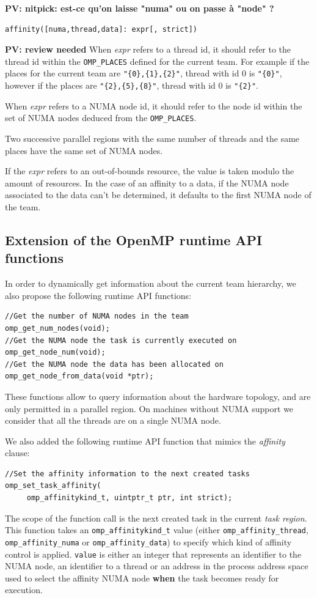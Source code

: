 \documentclass{Styles/llncs}
\newcommand{\PV}[1]{{\color{purple}\bfseries PV: #1}}
\begin{document}
\PV{nitpick: est-ce qu'on laisse "numa" ou on passe à "node" ?}
\begin{lstlisting}
affinity([numa,thread,data]: expr[, strict])
\end{lstlisting}

\PV{review needed}
When \emph{expr} refers to a thread id, it should refer to the thread id within
the \verb/OMP_PLACES/ defined for the current team. For example if the places for the
current team are \verb/"{0},{1},{2}"/, thread with id 0 is \verb/"{0}"/,
however if the places are \verb/"{2},{5},{8}"/, thread with id 0 is \verb/"{2}"/.

When \emph{expr} refers to a NUMA node id, it should refer to the node id within
the set of NUMA nodes deduced from the \verb/OMP_PLACES/.

Two successive parallel regions with the same number of threads and the same places have
the same set of NUMA nodes.

If the \emph{expr} refers to an out-of-bounds resource, the value is taken modulo the amount of resources.
In the case of an affinity to a data, if the NUMA node associated to the data can't be determined, it defaults to the first NUMA node of the team.

\subsection{Extension of the OpenMP runtime API functions}
In order to dynamically get information about the current team hierarchy, we also propose
the following runtime API functions:
\begin{lstlisting}
//Get the number of NUMA nodes in the team
omp_get_num_nodes(void);
//Get the NUMA node the task is currently executed on
omp_get_node_num(void);
//Get the NUMA node the data has been allocated on
omp_get_node_from_data(void *ptr);
\end{lstlisting}

These functions allow to query information about the hardware topology, and are only permitted
in a parallel region. On machines without NUMA support we consider that all the threads are on a single NUMA node.

We also added the following runtime API function that mimics the \textit{affinity} clause:
\begin{lstlisting}
//Set the affinity information to the next created tasks
omp_set_task_affinity( 
     omp_affinitykind_t, uintptr_t ptr, int strict);
\end{lstlisting}
The scope of the function call is the next created task in the current \textit{task region}.
This function takes an \texttt{omp\_affinitykind\_t} value (either \texttt{omp\_affinity\_thread}, \texttt{omp\_affinity\_numa} or \texttt{omp\_affinity\_data}) to specify which kind of affinity control is applied. \texttt{value} is either an integer that represents an identifier to the NUMA node, an identifier to a thread or an address in the process address space used to select the affinity NUMA node \textbf{when} the task becomes ready for execution.
\end{document}
